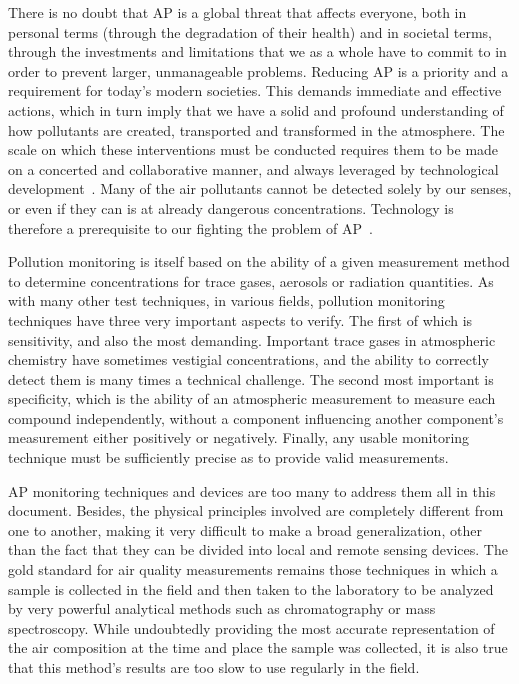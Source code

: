 There is no doubt that \gls{AP} is a global threat that affects
everyone, both in personal terms (through the degradation of their
health) and in societal terms, through the investments and limitations
that we as a whole have to commit to in order to prevent larger,
unmanageable problems. Reducing \gls{AP} is a priority and a requirement
for today's modern societies. This demands immediate and effective
actions, which in turn imply that we have a solid and profound
understanding of how pollutants are created, transported and transformed
in the atmosphere. The scale on which these interventions must be
conducted requires them to be made on a concerted and collaborative
manner, and always leveraged by technological
development~\cite{EEA2019}. Many of the air pollutants cannot be
detected solely by our senses, or even if they can is at already
dangerous concentrations. Technology is therefore a prerequisite to our
fighting the problem of \acrlong{AP}~\cite{Vallero2014}.

Pollution monitoring is itself based on the ability of a given
measurement method to determine concentrations for trace gases, aerosols
or radiation quantities. As with many other test techniques, in various
fields, pollution monitoring techniques have three very important
aspects to verify. The first of which is sensitivity, and also the most
demanding. Important trace gases in atmospheric chemistry have sometimes
vestigial concentrations, and the ability to correctly detect them is
many times a technical challenge. The second most important is
specificity, which is the ability of an atmospheric measurement to
measure each compound independently, without a component influencing
another component's measurement either positively or negatively.
Finally, any usable monitoring technique must be sufficiently precise as
to provide valid measurements.

\acrlong{AP} monitoring techniques and devices are too many to address
them all in this document. Besides, the physical principles involved are
completely different from one to another, making it very difficult to
make a broad generalization, other than the fact that they can be
divided into local and remote sensing devices. The gold standard for air
quality measurements remains those techniques in which a sample is
collected in the field and then taken to the laboratory to be analyzed
by very powerful analytical methods such as chromatography or mass
spectroscopy. While undoubtedly providing the most accurate
representation of the air composition at the time and place the sample
was collected, it is also true that this method's results are too slow
to use regularly in the field.

